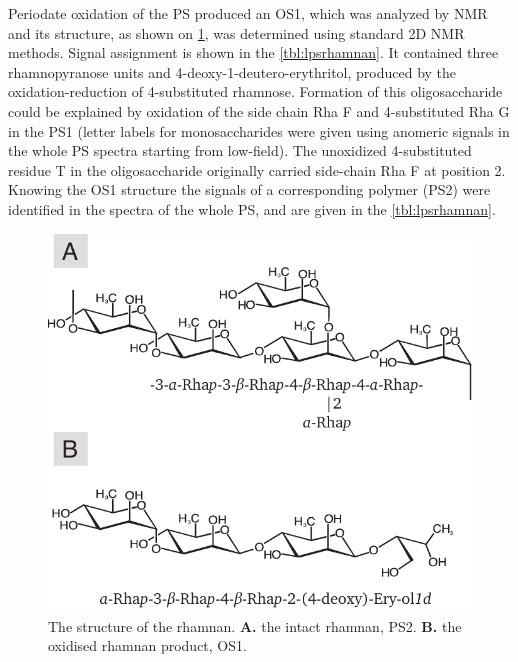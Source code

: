 		Periodate oxidation of the \ac{PS} produced an \ac{OS}1, which was analyzed by \ac{NMR} and its structure, as shown on \cref{fig:lpsrhamnan}, was determined using standard 2D \ac{NMR} methods. Signal assignment is shown in the \cref{tbl:lpsrhamnan}. It contained three rhamnopyranose units and 4-deoxy-1-deutero-erythritol, produced by the oxidation-reduction of 4-substituted rhamnose. Formation of this oligosaccharide could be explained by oxidation of the side chain Rha F and 4-substituted Rha G in the \ac{PS}1 (letter labels for monosaccharides were given using anomeric signals in the whole \ac{PS} spectra starting from low-field). The unoxidized 4-substituted residue T in the oligosaccharide originally carried side-chain Rha F at position 2. Knowing the \ac{OS}1 structure the signals of a corresponding polymer (\ac{PS}2) were identified in the spectra of the whole \ac{PS}, and are given in the \cref{tbl:lpsrhamnan}. 

		\begin{figure}[htb]
			\begin{center}
				\includegraphics[]{lps_chapter/img/lpsrhamnan.pdf}
			\end{center}
			\caption{The structure of the \caulobacter rhamnan. \textbf{A.} the intact rhamnan, \ac{PS}2. \textbf{B.} the oxidised rhamnan product, \ac{OS}1.}
			\label{fig:lpsrhamnan}
		\end{figure}

